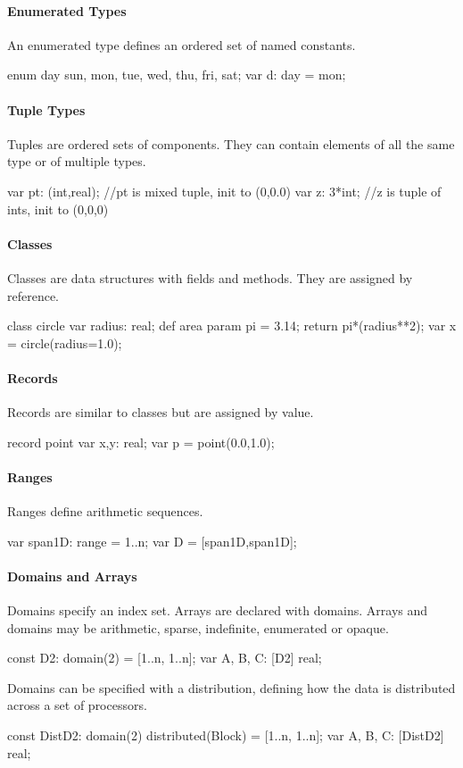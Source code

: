 \paragraph{Enumerated Types}
An enumerated type defines an ordered set of named constants.
\begin{chapel}
enum day {sun, mon, tue, wed, thu, fri, sat};
var d: day = mon;
\end{chapel}

\paragraph{Tuple Types}
Tuples are ordered sets of components.  They can contain
elements of all the same type or of multiple types.
\begin{chapel}
var pt: (int,real); //pt is mixed tuple, init to (0,0.0)
var z: 3*int; //z is tuple of ints, init to (0,0,0)
\end{chapel}

\paragraph{Classes}
Classes are data structures with fields and methods.  They
are assigned by reference.
\begin{chapel}
class circle {
  var radius: real;
  def area {
    param pi = 3.14;
    return pi*(radius**2);
  }
}
var x = circle(radius=1.0);
\end{chapel}

\paragraph{Records}
Records are similar to classes but are assigned by
value.
\begin{chapel}
record point {
  var x,y: real;
}
var p = point(0.0,1.0);
\end{chapel}

\paragraph{Ranges}
Ranges define arithmetic sequences.
\begin{chapel}
var span1D: range = 1..n;
var D = [span1D,span1D];
\end{chapel}

\paragraph{Domains and Arrays}
Domains specify an index set.  Arrays are declared with domains.
Arrays and domains may
be arithmetic, sparse, indefinite, enumerated or opaque.
\begin{chapel}
const D2: domain(2) = [1..n, 1..n];
var A, B, C: [D2] real;
\end{chapel}
Domains can be specified with a distribution, defining how the
data is distributed across a set of processors.
\begin{chapel}
const DistD2: domain(2) distributed(Block) = [1..n, 1..n];
var A, B, C: [DistD2] real;
\end{chapel}

